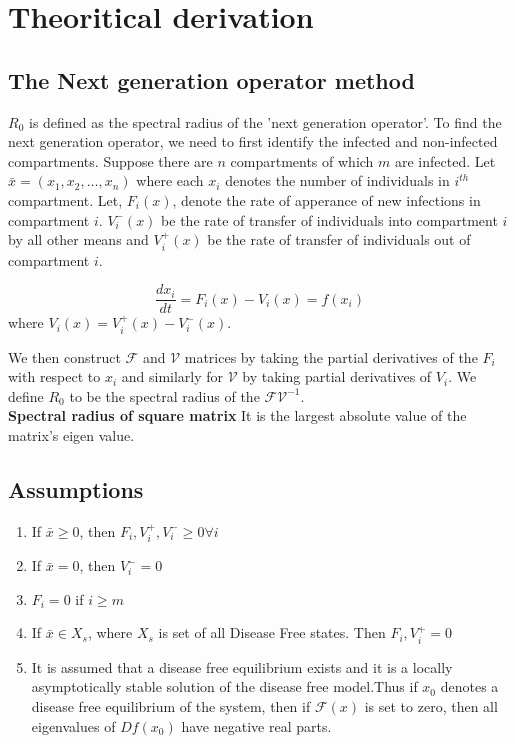 \documentclass{article}
\begin{document}
\section{Theoritical derivation}
\subsection{The Next generation operator method}
$R_{0}$ is defined as the spectral radius of the 'next generation
operator'.  To find the next generation operator, we need to first
identify the infected and non-infected compartments. Suppose there are
$n$ compartments of which $m$ are infected. Let $\bar{x}=(x_{1},x_{2},\dots,x_{n})$
where each $x_{i}$ denotes the number of individuals in $i^{th}$ compartment.
Let, $F_{i}(x)$, denote the rate of apperance of new infections in compartment $i$.
$V^{-}_{i}(x)$ be the rate of transfer of individuals into compartment $i$ by all other means and
$V^{+}_{i}(x)$ be the rate of transfer of individuals out of compartment $i$.

$$\frac{dx_{i}}{dt}=F_{i}(x)-V_{i}(x)= f(x_{i})$$  where $V_{i}(x)=V^{+}_{i}(x)-V^{-}_{i}(x)$.

We then construct $\mathcal{F}$ and $\mathcal{V}$ matrices by taking
the partial derivatives of the $F_{i}$ with respect to $x_{i}$ and
similarly for $\mathcal{V}$ by taking partial derivatives of $V_{i}$.
We define $R_{0}$ to be the spectral radius of the $\mathcal{F}\mathcal{V}^{-1}$.\\
\textbf{Spectral radius of square matrix} It is the  largest absolute value of the matrix's eigen value.


\subsection{Assumptions}
\begin{enumerate}
\item If $\bar{x} \geq 0$, then $F_{i},V_{i}^{+}, V_{i}^{-} \geq 0 \forall i$
\item If $\bar{x} = 0$, then $V_{i}^{-} = 0$
\item $F_{i} = 0$ if $i \geq m$
\item If $\bar{x} \in X_{s} $, where $X_{s}$ is set of all Disease Free states. Then $F_{i},V_{i}^{+}=0$
  \item It is assumed that a disease free equilibrium exists and it is a locally asymptotically stable solution of the disease free model.Thus if $x_{0}$ denotes a disease free equilibrium of the system, then if $\mathcal{F}(x)$ is set to zero, then all eigenvalues of $Df(x_{0})$ have negative real parts.
\end{enumerate}
\end{document}
